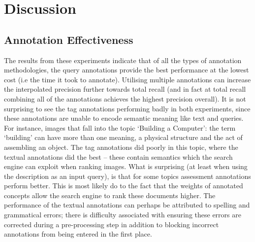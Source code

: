 \chapter{Discussion}

\section{Annotation Effectiveness}

The results from these experiments indicate that of all the types of annotation methodologies, the query annotations provide the best performance at the lowest cost (i.e the time it took to annotate). Utilising multiple annotations can increase the interpolated precision further towards total recall (and in fact at total recall combining all of the annotations achieves the highest precision overall). It is not surprising to see the tag annotations performing badly in both experiments, since these annotations are unable to encode semantic meaning like text and queries. For instance, images that fall into the topic `Building a Computer': the term `building' can have more than one meaning, a physical structure and the act of assembling an object. The tag annotations did poorly in this topic, where the textual annotations did the best -- these contain semantics which the search engine can exploit when ranking images.  What is surprising (at least when using the description as an input query), is that for some topics assessment annotations perform better. This is most likely do to the fact that the weights of annotated concepts allow the search engine to rank these documents higher. The performance of the textual annotations can perhaps be attributed to spelling and grammatical errors; there is difficulty associated with ensuring these errors are corrected during a pre-processing step in addition to blocking incorrect annotations from being entered in the first place.

